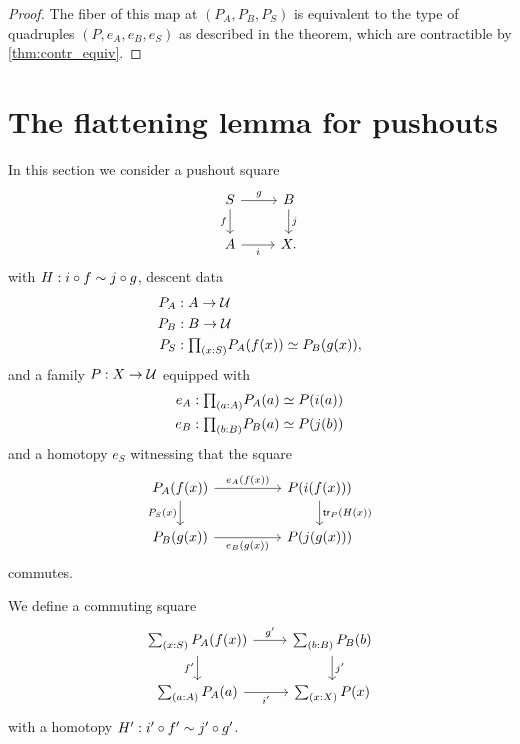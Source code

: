 \begin{proof}
The fiber of this map at $(P_A,P_B,P_S)$ is equivalent to the type of quadruples $(P,e_A,e_B,e_S)$ as described in the theorem, which are contractible by \cref{thm:contr_equiv}.
\end{proof}

\section{The flattening lemma for pushouts}

In this section we consider a pushout square
\begin{equation*}
\begin{tikzcd}
S \arrow[r,"g"] \arrow[d,swap,"f"] & B \arrow[d,"j"] \\
A \arrow[r,swap,"i"] & X.
\end{tikzcd}
\end{equation*}
with $H:i\circ f\sim j\circ g$, descent data
\begin{align*}
P_A & : A \to \UU \\
P_B & : B \to \UU \\
P_S & : \prd{x:S} \eqv{P_A(f(x))}{P_B(g(x))},
\end{align*}
and a family $P:X\to\mathcal{U}$ equipped with 
\begin{align*}
e_A & : \prd{a:A}\eqv{P_A(a)}{P(i(a))} \\
e_B & : \prd{b:B}\eqv{P_B(a)}{P(j(b))}
\end{align*}
and a homotopy $e_S$ witnessing that the square
\begin{equation*}
\begin{tikzcd}[column sep=huge]
P_A(f(x)) \arrow[r,"e_A(f(x))"] \arrow[d,swap,"P_S(x)"] & P(i(f(x))) \arrow[d,"\mathsf{tr}_P(H(x))"] \\
P_B(g(x)) \arrow[r,swap,"e_B(g(x))"] & P(j(g(x)))
\end{tikzcd}
\end{equation*}
commutes.

\begin{defn}
We define a commuting square
\begin{equation*}
\begin{tikzcd}
\sm{x:S}P_A(f(x)) \arrow[d,swap,"{f'}"] \arrow[r,"{g'}"] & \sm{b:B}P_B(b) \arrow[d,"{j'}"] \\
\sm{a:A}P_A(a) \arrow[r,swap,"{i'}"] & \sm{x:X}P(x)
\end{tikzcd}
\end{equation*}
with a homotopy $H':i'\circ f'\sim j'\circ g'$.
\end{defn}


